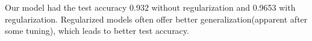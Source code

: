 \begin{answer}
Our model had the test accuracy 0.932 without regularization and 0.9653 with regularization. Regularized models often offer better generalization(apparent after some tuning), which leads to better test accuracy. \\
\end{answer}
   
  
